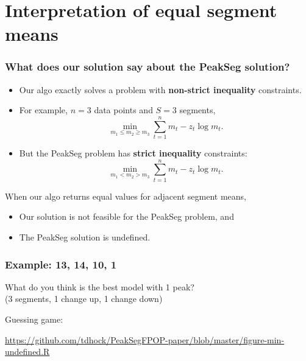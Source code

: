 \documentclass{beamer}
\begin{document}

\section*{Interpretation of equal segment means}

\begin{frame}
  \frametitle{What does our solution say about the PeakSeg solution?}
  \begin{itemize}
  \item Our algo exactly solves a problem with \textbf{non-strict
      inequality} constraints.
  \item For example, $n=3$ data points and $S=3$ segments,
    \begin{equation*}
      \min_{m_1\leq m_2\geq m_3}
      \sum_{t=1}^n m_t - z_t\log m_t.
    \end{equation*}
  \item But the PeakSeg problem has \textbf{strict inequality}
    constraints:
    \begin{equation*}
      \min_{m_1<m_2 >m_3}
      \sum_{t=1}^n m_t - z_t\log m_t.
    \end{equation*}
  \end{itemize}
  When our algo returns equal values for adjacent segment means,
  \begin{itemize}
  \item Our solution is not feasible for the PeakSeg problem, and
  \item The PeakSeg solution is undefined.
  \end{itemize}
\end{frame}


\begin{frame}
  \frametitle{Example: 13, 14, 10, 1}
  What do you think is the best model with 1 peak?\\
  (3 segments, 1 change up, 1 change down)
  
  \vskip 1cm

  Guessing game:

  \url{https://github.com/tdhock/PeakSegFPOP-paper/blob/master/figure-min-undefined.R} 
\end{frame}
\end{document}
